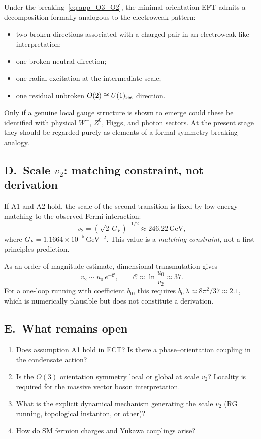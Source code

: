 \documentclass[11pt,a4paper]{article}
\numberwithin{equation}{section}
\begin{document}
Under the breaking~\eqref{eq:app_O3_O2}, the minimal orientation EFT
admits a decomposition formally analogous to the electroweak pattern:
\begin{itemize}
  \item two broken directions associated with a charged pair in an
    electroweak-like interpretation;
  \item one broken neutral direction;
  \item one radial excitation at the intermediate scale;
  \item one residual unbroken $O(2)\cong U(1)_{\rm res}$ direction.
\end{itemize}

Only if a genuine local gauge structure is shown to emerge could these
be identified with physical $W^\pm$, $Z^0$, Higgs, and photon sectors.
At the present stage they should be regarded purely as elements of a
formal symmetry-breaking analogy.

\subsection*{D.\ Scale $v_2$: matching constraint, not derivation}

If A1 and A2 hold, the scale of the second transition is fixed
by low-energy matching to the observed Fermi interaction:
\begin{equation}
  v_2 = \left(\sqrt{2}\,G_F\right)^{-1/2}
  \approx 246.22\,\text{GeV},
  \label{eq:app_v2_matching}
\end{equation}
where $G_F=1.1664\times10^{-5}$\,GeV$^{-2}$.
This value is a \emph{matching constraint}, not a first-principles
prediction.

As an order-of-magnitude estimate, dimensional transmutation
gives
\begin{equation}
  v_2 \sim u_0\,e^{-\mathcal{C}},
  \qquad
  \mathcal{C} \approx \ln\!\frac{u_0}{v_2} \approx 37.
  \label{eq:app_transmut}
\end{equation}
For a one-loop running with coefficient $b_0$, this requires
$b_0\,\lambda\approx8\pi^2/37\approx2.1$, which is numerically
plausible but does not constitute a derivation.

\subsection*{E.\ What remains open}

\begin{enumerate}
  \item Does assumption A1 hold in ECT?
    Is there a phase--orientation coupling in the condensate action?
  \item Is the $O(3)$ orientation symmetry local or global
    at scale $v_2$? Locality is required for the massive vector
    boson interpretation.
  \item What is the explicit dynamical mechanism generating
    the scale $v_2$ (RG running, topological instanton, or other)?
  \item How do SM fermion charges and Yukawa couplings arise?
\end{enumerate}
\end{document}
